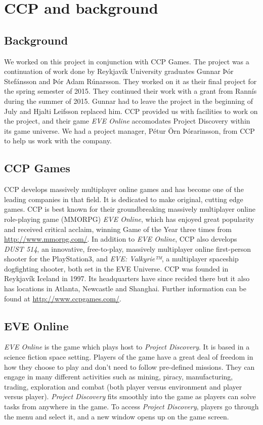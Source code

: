 \section{CCP and background}\label{sec:ccp}

\subsection{Background}

We worked on this project in conjunction with CCP Games. The project was a continuation of work done by Reykjavík University graduates Gunnar Þór Stefánsson and Þór Adam Rúnarsson. They worked on it as their final project for the spring semester of 2015. They continued their work with a grant from Rannís during the summer of 2015. Gunnar had to leave the project in the beginning of July and Hjalti Leifsson replaced him. CCP provided us with facilities to work on the project, and their game \emph{EVE Online} accomodates Project Discovery within its game universe. We had a project manager, Pétur Örn Þórarinsson, from CCP to help us work with the company. 

\subsection{CCP Games}

CCP develops massively multiplayer online games and has become one of the leading companies in that field. It is dedicated to make original, cutting edge games. CCP is best known for their groundbreaking massively multiplayer online role-playing game (MMORPG) \emph{EVE Online}, which has enjoyed great popularity and received critical acclaim, winning Game of the Year three times from \url{http://www.mmorpg.com/}. In addition to \emph{EVE Online}, CCP also develops \emph{DUST 514\textsuperscript{\textregistered}}, an innovative, free-to-play, massively multiplayer online first-person shooter for the PlayStation\textsuperscript{\textregistered}3, and \emph{EVE: Valkyrie™}, a multiplayer spaceship dogfighting shooter, both set in the EVE Universe. CCP was founded in Reykjavík Iceland in 1997. Its headquarters have since recided there but it also has locations in Atlanta, Newcastle and Shanghai. Further information can be found at \url{http://www.ccpgames.com/}.

\subsection{EVE Online}
\emph{EVE Online} is the game which plays host to \emph{Project Discovery}. It is based in a science fiction space setting. Players of the game have a great deal of freedom in how they choose to play and don't need to follow pre-defined missions. They can engage in many different activities such as mining, piracy, manufacturing, trading, exploration and combat (both player versus environment and player versus player). \emph{Project Discovery} fits smoothly into the game as players can solve tasks from anywhere in the game. To access \emph{Project Discovery}, players go through the menu and select it, and a new window opens up on the game screen.
